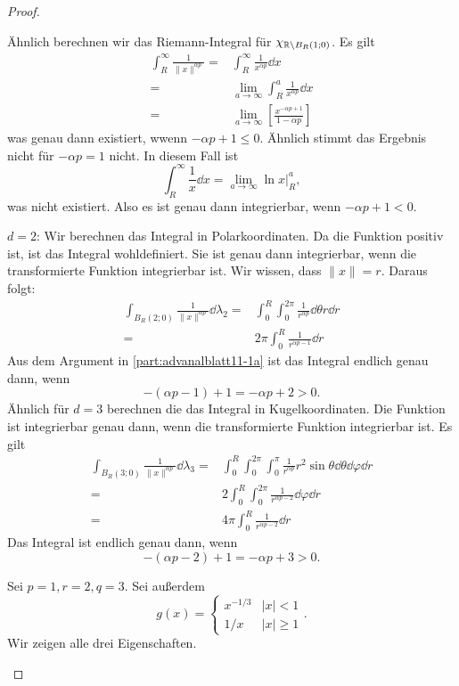 \begin{proof}
\begin{parts}
	Ähnlich berechnen wir das Riemann-Integral f\"{u}r $\chi_{\mathbb{R}\backslash B_R(1;0)}$. Es gilt
	\begin{align*}
		\int_R^\infty \frac{1}{\|x\|^{\alpha p}}=&\int_R^\infty \frac{1}{x^{\alpha p}}\dd{x}\\
		=&\lim_{a \to \infty} \int_R^a \frac{1}{x^{\alpha p}}\dd{x}\\
		=&\lim_{a \to \infty} \left[ \frac{x^{-\alpha p+1}}{1-\alpha p} \right]
	\end{align*}
	was genau dann existiert, wwenn $-\alpha p + 1\le 0$. Ähnlich stimmt das Ergebnis nicht f\"{u}r $-\alpha p = 1$ nicht. In diesem Fall ist
	\[
		\int_R^\infty \frac{1}{x}\dd{x}=\lim_{a \to \infty} \ln x |_R^a
	,\]
	was nicht existiert. Also es ist genau dann integrierbar, wenn $-\alpha p + 1 < 0$.
\item $d=2$: Wir berechnen das Integral in Polarkoordinaten. Da die Funktion positiv ist, ist das Integral wohldefiniert. Sie ist genau dann integrierbar, wenn die transformierte Funktion integrierbar ist. Wir wissen, dass $\|x\|=r$. Daraus folgt:
	\begin{align*}
		\int_{B_R(2;0)} \frac{1}{\|x\|^{\alpha p}}\dd{\lambda_2}=&\int_0^R\int_0^{2\pi} \frac{1}{r^{\alpha p}}\dd{\theta}r\dd{r}\\
		=& 2\pi\int_0^R \frac{1}{r^{\alpha p-1}}\dd{r}
	\end{align*}
	Aus dem Argument in \ref{part:advanalblatt11-1a} ist das Integral endlich genau dann, wenn
	\[
		-(\alpha p - 1)+1=-\alpha p+2>0
	.\] 
	Ähnlich für $d=3$ berechnen die das Integral in Kugelkoordinaten. Die Funktion ist integrierbar genau dann, wenn die transformierte Funktion integrierbar ist. Es gilt
	\begin{align*}
		\int_{B_R(3;0)}\frac{1}{\|x\|^{\alpha p}}\dd{\lambda_3}=& \int_0^R\int_0^{2\pi}\int_0^\pi \frac{1}{r^{\alpha p}}r^2\sin\theta\dd{\theta}\dd{\varphi}\dd{r}\\
		=&2\int_0^R \int_0^{2\pi}\frac{1}{r^{\alpha p - 2}}\dd{\varphi}\dd{r}\\
		=&4\pi\int_0^R \frac{1}{r^{\alpha p - 2}}\dd{r}
	\end{align*}
	Das Integral ist endlich genau dann, wenn
	\[
		-(\alpha p - 2)+1=-\alpha p + 3>0
	.\] 
\item Sei $p=1,r=2,q=3$. Sei außerdem
	\[
	g(x)=\begin{cases}
		x^{- 1 / 3} & |x|<1\\
		1 / x & |x| \ge 1
	\end{cases}
	.\] 
	Wir zeigen alle drei Eigenschaften.

\end{parts}
\end{proof}
